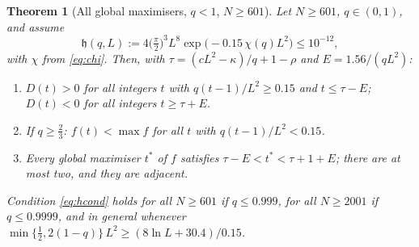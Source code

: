 \documentclass[11pt,a4paper]{article}
\newtheorem{theorem}{Theorem}[section]
\theoremstyle{definition}
\theoremstyle{remark}
\begin{document}
\begin{theorem}[All global maximisers, $q<1$, $N\ge601$]\label{thm:global}
Let $N\ge601$, $q\in(0,1)$, and assume
\begin{equation}\label{eq:hcond}
  \mathfrak h(q,L):=4\bigl(\tfrac\pi2\bigr)^3L^8\exp\bigl(-0.15\,\chi(q)L^2\bigr)\le10^{-12},
\end{equation}
with $\chi$ from \eqref{eq:chi}. Then, with $\tau=(cL^2-\kappa)/q+1-\rho$ and $E=1.56/(qL^2)$:
\begin{enumerate}
\item $D(t)>0$ for all integers $t$ with $q(t-1)/L^2\ge0.15$ and $t\le\tau-E$; $D(t)<0$ for all integers $t\ge\tau+E$.
\item If $q\ge\frac23$: $f(t)<\max f$ for all $t$ with $q(t-1)/L^2<0.15$.
\item Every global maximiser $t^*$ of $f$ satisfies $\tau-E<t^*<\tau+1+E$; there are at most two, and they are adjacent.
\end{enumerate}
Condition \eqref{eq:hcond} holds for all $N\ge601$ if $q\le0.999$, for all $N\ge2001$ if $q\le0.9999$, and in
general whenever $\min\{\frac12,2(1-q)\}\,L^2\ge(8\ln L+30.4)/0.15$.
\end{theorem}
\end{document}
